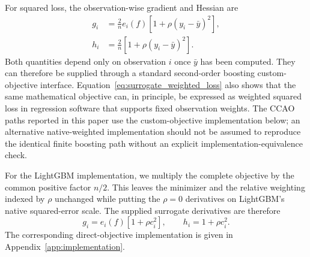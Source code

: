 \documentclass[10pt]{article}
\theoremstyle{definition}
\newcommand{\1}{\mathbf{1}}
\newcommand{\oldtext}[1]{\textcolor{blue}{\sout{#1}}}
\newcommand{\newtext}[1]{\textcolor{impGreen}{#1}}
\begin{document}

For squared loss, the observation-wise gradient and Hessian are
\begin{align}
\label{eq:surrogate_derivatives}
g_i
&=
\frac{2}{n}e_i(f)
\left[1+\rho(y_i-\bar y)^2\right],
\\
h_i
&=
\frac{2}{n}
\left[1+\rho(y_i-\bar y)^2\right].
\end{align}
\newtext{Both quantities depend only on observation $i$ once $\bar y$ has been computed. They can therefore be supplied through a standard second-order boosting custom-objective interface. Equation~\eqref{eq:surrogate_weighted_loss} also shows that the same mathematical objective can, in principle, be expressed as weighted squared loss in regression software that supports fixed observation weights. The CCAO paths reported in this paper use the custom-objective implementation below; an alternative native-weighted implementation should not be assumed to reproduce the identical finite boosting path without an explicit implementation-equivalence check.}


{For the LightGBM implementation, we multiply the complete objective by the common positive factor $n/2$. This leaves the minimizer and the relative weighting indexed by $\rho$ unchanged while putting the $\rho=0$ derivatives on LightGBM's native squared-error scale. The supplied surrogate derivatives are therefore
\[
g_i=e_i(f)\left[1+\rho c_i^2\right],
\qquad
h_i=1+\rho c_i^2.
\]
The corresponding direct-objective implementation is given in Appendix~\ref{app:implementation}.}

\end{document}
